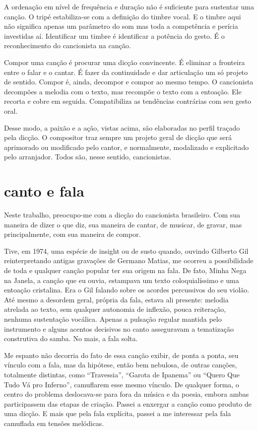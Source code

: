 A ordenação em nível de frequência e duração não é suficiente para
sustentar uma canção. O tripé estabiliza-se com a definição do timbre
vocal. E o timbre aqui não significa apenas um parâmetro do som mas toda
a competência e perícia investidas aí. Identificar um timbre é
identificar a potência do gesto. É o reconhecimento do cancionista na
canção.

Compor uma canção é procurar uma dicção convincente. É eliminar a
fronteira entre o falar e o cantar. É fazer da continuidade e dar
articulação um só projeto de sentido. Compor é, ainda, decompor e compor
ao mesmo tempo. O cancionista decompões a melodia com o texto, mas
recompõe o texto com a entoação. Ele recorta e cobre em seguida.
Compatibiliza as tendências contrárias com seu gesto oral.

Desse modo, a paixão e a ação, vistas acima, são elaboradas no perfil
traçado pela dicção. O compositor traz sempre um projeto geral de dicção
que será aprimorado ou modificado pelo cantor, e normalmente, modalizado
e explicitado pelo arranjador. Todos são, nesse sentido, cancionistas.

\section{canto e fala}

Neste trabalho, preocupo-me com a dicção do cancionista brasileiro. Com
sua maneira de dizer o que diz, sua maneira de cantar, de musicar, de
gravar, mas principalmente, com sua maneira de compor.

Tive, em 1974, uma espécie de insight ou de susto quando, ouvindo
Gilberto Gil reinterpretando antigas gravações de Germano Matias, me
ocorreu a possibilidade de toda e qualquer canção popular ter sua origem
na fala. De fato, Minha Nega na Janela, a canção que eu ouvia, estampava
um texto coloquialíssimo e uma entoação cristalina. Era o Gil falando
sobre os acordes percussivos do seu violão. Até mesmo a desordem geral,
própria da fala, estava ali presente: melodia atrelada ao texto, sem
qualquer autonomia de inflexão, pouca reiteração, nenhuma sustentação
vocálica. Apenas a pulsação regular mantida pelo instrumento e alguns
acentos decisivos no canto asseguravam a tematização construtiva do
samba. No mais, a fala solta.

Me espanto não decorria do fato de essa canção exibir, de ponta a ponta,
seu vínculo com a fala, mas da hipótese, então bem nebulosa, de outras
canções, totalmente distintas, como ``Travessia'', ``Garota de Ipanema'' ou
``Quero Que Tudo Vá pro Inferno'', camuflarem esse mesmo vínculo. De
qualquer forma, o centro do problema deslocava-se para fora da música e
da poesia, embora ambas participassem das etapas de criação. Passei a
enxergar a canção como produto de uma dicção. E mais que pela fala
explícita, passei a me interessar pela fala camuflada em tensões
melódicas.

